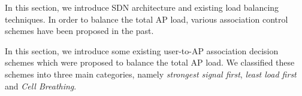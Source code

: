 In this section, we introduce SDN architecture and existing load balancing techniques. In order to balance the total AP load, various association control schemes have been proposed in the past.






In this section, we introduce some existing user-to-AP association decision schemes which were proposed to balance the total AP load. We classified these schemes into three main categories, namely \emph{strongest signal first}, \emph{least load first} and \emph{Cell Breathing}.

